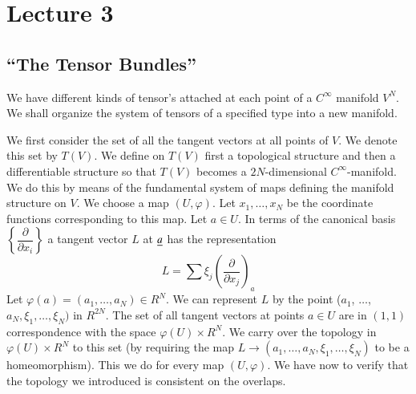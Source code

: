 \chapter{Lecture 3}

\section*{``The Tensor Bundles''}\pageoriginale

We have different kinds of tensor's attached at each point of a
$C^{\infty}$ manifold $V^{N}$. We shall organize the system of tensors
of a specified type into a new manifold.

We first consider the set of all the tangent vectors at all points of
$V$. We denote this set by $T(V)$. We define on $T(V)$ first a
topological structure and then a differentiable structure so that
$T(V)$ becomes a $2N$-dimensional $C^{\infty}$-manifold. We do this by
means of the fundamental system of maps defining the manifold
structure on $V$. We choose a map $(U,\varphi)$. Let
$x_{1},\ldots,x_{N}$ be the coordinate functions corresponding to this
map. Let $a\in U$. In terms of the canonical basis
$\left\{\dfrac{\partial}{\partial x_{i}}\right\}$ a tangent vector $L$
at $\underline{a}$ has the representation
$$
L=\sum \xi_{j}\left(\frac{\partial}{\partial x_{j}}\right)_{a}
$$
Let $\varphi(a)=(a_{1},\ldots,a_{N})\in R^{N}$. We can represent $L$
by the point ($a_{1}$, $\ldots$, $a_{N},\xi_{1},\ldots,\xi_{N})$ in
$R^{2N}$. The set of all tangent vectors at points $a\in U$ are in
$(1,1)$ correspondence with the space $\varphi(U)\times R^{N}$. We
carry over the topology in $\varphi(U)\times R^{N}$ to this set (by
requiring the map $L\to (a_{1},\ldots,a_{N},\xi_{1},\ldots,\xi_{N})$
to be a homeomorphism). This we do for every map $(U,\varphi)$. We
have now to verify that the topology we introduced is consistent on
the overlaps.

